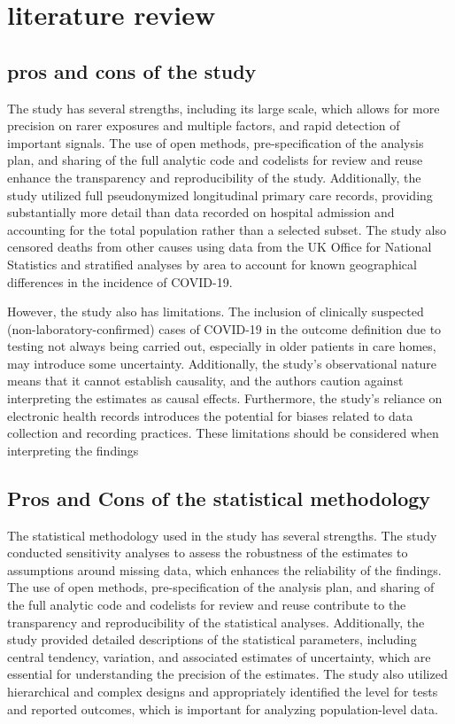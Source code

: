 \documentclass{article}
\begin{document}
\section{literature review}

\subsection*{pros and cons of the study}

The study has several strengths, including its large scale, which allows for more precision on rarer exposures and multiple factors, and rapid detection of important signals. The use of open methods, pre-specification of the analysis plan, and sharing of the full analytic code and codelists for review and reuse enhance the transparency and reproducibility of the study. Additionally, the study utilized full pseudonymized longitudinal primary care records, providing substantially more detail than data recorded on hospital admission and accounting for the total population rather than a selected subset. The study also censored deaths from other causes using data from the UK Office for National Statistics and stratified analyses by area to account for known geographical differences in the incidence of COVID-19.


However, the study also has limitations. The inclusion of clinically suspected (non-laboratory-confirmed) cases of COVID-19 in the outcome definition due to testing not always being carried out, especially in older patients in care homes, may introduce some uncertainty. Additionally, the study's observational nature means that it cannot establish causality, and the authors caution against interpreting the estimates as causal effects. Furthermore, the study's reliance on electronic health records introduces the potential for biases related to data collection and recording practices. These limitations should be considered when interpreting the findings

\subsection*{Pros and Cons of the statistical methodology}

The statistical methodology used in the study has several strengths. The study conducted sensitivity analyses to assess the robustness of the estimates to assumptions around missing data, which enhances the reliability of the findings. The use of open methods, pre-specification of the analysis plan, and sharing of the full analytic code and codelists for review and reuse contribute to the transparency and reproducibility of the statistical analyses. Additionally, the study provided detailed descriptions of the statistical parameters, including central tendency, variation, and associated estimates of uncertainty, which are essential for understanding the precision of the estimates. The study also utilized hierarchical and complex designs and appropriately identified the level for tests and reported outcomes, which is important for analyzing population-level data.
\end{document}
